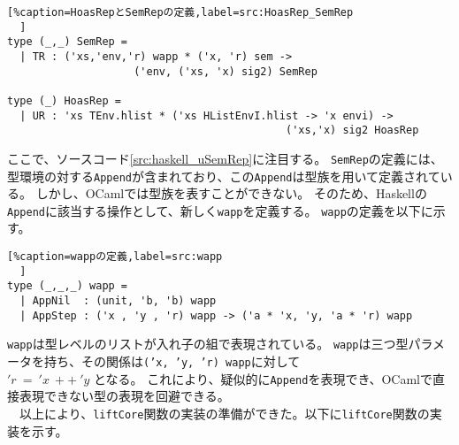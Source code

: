 \documentclass[uplatex]{sumiilab-paper}
\theoremstyle{mystyle}
\numberwithin{definition}{chapter} %
\begin{document}
\begin{lstlisting}[%caption=HoasRepとSemRepの定義,label=src:HoasRep_SemRep
  ]
type (_,_) SemRep = 
  | TR : ('xs,'env,'r) wapp * ('x, 'r) sem -> 
                    ('env, ('xs, 'x) sig2) SemRep

type (_) HoasRep =
  | UR : 'xs TEnv.hlist * ('xs HListEnvI.hlist -> 'x envi) -> 
                                            ('xs,'x) sig2 HoasRep 
\end{lstlisting}



ここで、ソースコード\ref{src:haskell_uSemRep}に注目する。
{\tt SemRep}の定義には、型環境の対する{\tt Append}が含まれており、この{\tt Append}は型族を用いて定義されている。
しかし、OCamlでは型族を表すことができない。
そのため、Haskellの{\tt Append}に該当する操作として、新しく{\tt wapp}を定義する。
{\tt wapp}の定義を以下に示す。

\begin{lstlisting}[%caption=wappの定義,label=src:wapp
  ]
type (_,_,_) wapp =
  | AppNil  : (unit, 'b, 'b) wapp
  | AppStep : ('x , 'y , 'r) wapp -> ('a * 'x, 'y, 'a * 'r) wapp
\end{lstlisting}

{\tt wapp}は型レベルのリストが入れ子の組で表現されている。
{\tt wapp}は三つ型パラメータを持ち、その関係は{\tt ('x, 'y, 'r) wapp}に対して \\
$'r~=~'x~++~'y$ となる。
これにより、疑似的に{\tt Append}を表現でき、OCamlで直接表現できない型の表現を回避できる。\\
　以上により、{\tt liftCore}関数の実装の準備ができた。以下に{\tt liftCore}関数の実装を示す。
\end{document}
